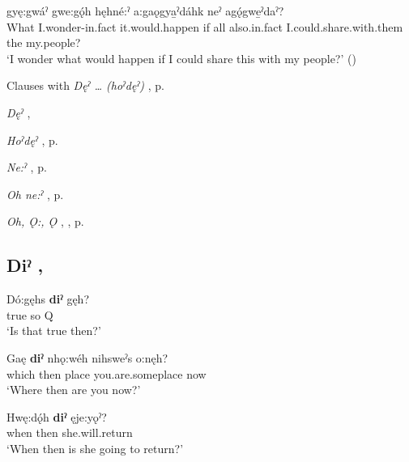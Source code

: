 \ea
\label{ex:dpart40}
 gyę:gwáˀ gwe:gǫ́h hęhné:ˀ a:gaǫgya̱ˀdáhk neˀ agǫ́gwe̱ˀdaˀ? \\
What I.wonder-in.fact it.would.happen if all also.in.fact I.could.share.with.them the my.people? \\
\glt ‘I wonder what would happen if I could share this with my people?’ (\cite{carrier_legends_2013})
\z

\begin{CayugaRelated}
\item Clauses with \textit{Dęˀ … (hoˀdęˀ)} , p. \pageref{ch:Clauses with [dęˀ … (hoˀdęˀ)] ‘what’}\\
\item \textit{Dęˀ} ,  \pageref{p:[dęˀ-]}\\
\item \textit{Hoˀdęˀ} , p. \pageref{p:[hoˀdęˀ]}\\
\item \textit{Ne:ˀ} , p. \pageref{p:[ne:ˀ] `it is’}\\
\item \textit{Oh ne:ˀ} , p. \pageref{p:[ǫh ne:ˀ]}\\
\item \textit{Oh, Ǫ:, Ǫ} , , p. \pageref{p:[ǫh, ǫ:, ǫ]}
\end{CayugaRelated}

\subsection*{\textbf{Diˀ} , } \label{p:[diˀ]}

\ea
\label{ex:dpart20}
\gll  Dó:gęhs \textbf{diˀ} gęh? \\
true so Q\\
\glt ‘Is that true then?’
\z

\ea
\label{ex:dpart21}
\gll Gaę \textbf{diˀ} nhǫ:wéh nihsweˀs o:nęh? \\
which then place you.are.someplace now\\
\glt ‘Where then are you now?’
\z

\ea
\label{ex:dpart22}
\gll Hwę:dǫ́h \textbf{diˀ} ęje:yǫˀ? \\
when then she.will.return\\
\glt ‘When then is she going to return?’
\z

